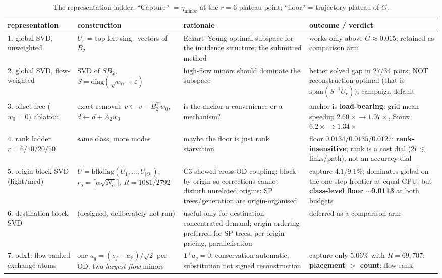 \documentclass[11pt]{article}
\begin{document}
\begin{table}[h]\centering\scriptsize
\caption{The representation ladder. ``Capture'' $=\eta_{\text{minor}}$ at the $r{=}6$
plateau point; ``floor'' = trajectory plateau of $G$.}
\begin{tabular}{p{2.9cm}p{4.3cm}p{4.6cm}p{3.0cm}}
\toprule
representation & construction & rationale & outcome / verdict\\
\midrule
1. global SVD, unweighted &
$U_r$ = top left sing.\ vectors of $B_2$ &
Eckart--Young optimal subspace for the incidence structure; the submitted method &
works only above $G{\approx}0.015$; retained as comparison arm\\[2pt]
2. global SVD, flow-weighted &
SVD of $SB_2$, $S{=}\mathrm{diag}(\sqrt{w_0}{+}\varepsilon)$ &
high-flow minors should dominate the subspace &
better solved gap in 27/34 pairs; NOT reconstruction-optimal (that is
$\mathrm{span}(S^{-1}\tilde U_r)$); campaign default\\[2pt]
3. offset-free ($w_0{=}0$) ablation &
exact removal: $v\!\leftarrow\!v{-}B_2^\top w_0$, $d\!\leftarrow\!d{+}A_2w_0$ &
is the anchor a convenience or a mechanism? &
anchor is \textbf{load-bearing}: grid mean speedup $2.60{\times}\!\to\!1.07{\times}$,
Sioux $6.2{\times}\!\to\!1.34{\times}$\\[2pt]
4. rank ladder $r{=}6/10/20/50$ &
same class, more modes &
maybe the floor is just rank starvation &
floor $0.0134/0.0135/0.0127$: \textbf{rank-insensitive}; rank is a cost dial
($2r\lesssim$ links/path), not an accuracy dial\\[2pt]
5. origin-block SVD (light/med) &
$U=\mathrm{blkdiag}(U_1,\dots,U_{|O|})$, $r_o=\lceil\alpha\sqrt{N_o}\rceil$,
$R{=}1081/2792$ &
C3 showed cross-OD coupling: block by origin so corrections cannot disturb unrelated
origins; SP trees/generation are origin-organised &
capture $4.1/9.1\%$; dominates global on the one-step frontier at equal CPU, but
\textbf{class-level floor $\sim$0.0113} at both budgets\\[2pt]
6. destination-block SVD &
(designed, deliberately not run) &
useful only for destination-concentrated demand; origin ordering preferred for SP
trees, per-origin pricing, parallelisation &
deferred as a comparison arm\\[2pt]
7. odx1: flow-ranked exchange atoms &
one $a_q{=}(e_j{-}e_{j'})/\sqrt2$ per OD, two \emph{largest-flow} minors &
$\mathbf1^\top a_q{=}0$: conservation automatic; substitution not signed
reconstruction &
capture only 5.06\% with $R{=}69{,}707$: \textbf{placement $>$ count}; flow rank

\end{tabular}
\end{table}
\end{document}

